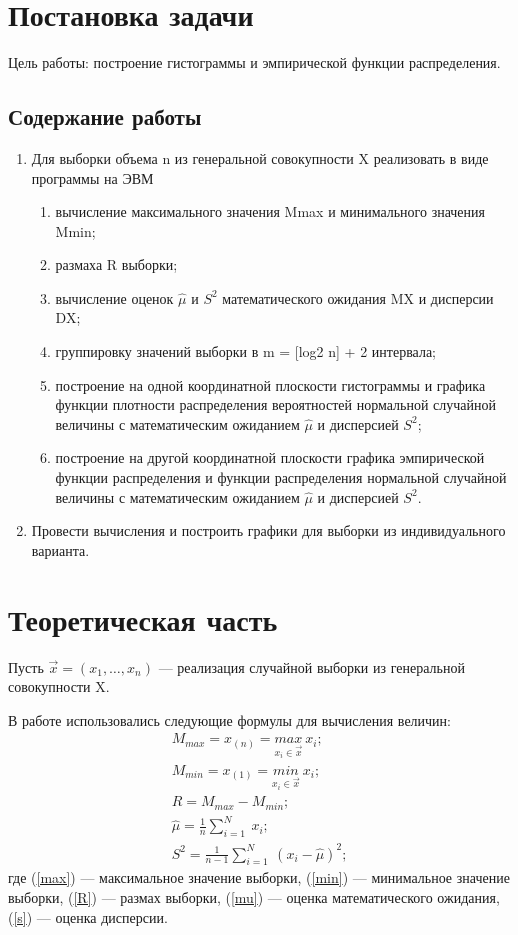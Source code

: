 \documentclass[a4paper, 14pt, unknownkeysallowed]{extreport}
\begin{document}

\setcounter{page}{2}

\chapter{Постановка задачи}
Цель работы: построение гистограммы и эмпирической функции распределения.
\section{Содержание работы}
\begin{enumerate}
	\item Для выборки объема n из генеральной совокупности X реализовать в виде программы на ЭВМ
	\begin{enumerate}
		\item вычисление максимального значения Mmax и минимального значения Mmin;
		\item размаха R выборки;
		\item вычисление оценок $\hat{\mu}$ и $S^2$ математического ожидания MX и дисперсии DX;
		\item группировку значений выборки в m = [log2 n] + 2 интервала;
		\item построение на одной координатной плоскости гистограммы и графика функции плотности распределения вероятностей нормальной случайной величины с математическим
		ожиданием  $\hat{\mu}$ и дисперсией $S^2$;
		\item построение на другой координатной плоскости графика эмпирической функции распределения и функции распределения нормальной случайной величины с математическим
		ожиданием $\hat{\mu}$ и дисперсией $S^2$.
	\end{enumerate}
	\item Провести вычисления и построить графики для выборки из индивидуального варианта.
\end{enumerate}

\chapter{Теоретическая часть}

Пусть $\vec{x} = (x_1, \dots, x_n)$ --- реализация случайной выборки из генеральной совокупности X.

В работе использовались следующие формулы для вычисления величин:
\begin{gather}
	\label{max}
	M_{max} = x_{(n)} = \underset{x_i \in \vec{x}}{max}~x_i;\\
	\label{min}
	M_{min} = x_{(1)} = \underset{x_i \in \vec{x}}{min}~x_i;\\
	\label{R}
	R = M_{max} - M_{min};\\
	\label{mu}
	\hat\mu = \frac{1}{n}\sum_{i = 1}^{N}~x_i;\\
	\label{s}
	S^2 = \frac{1}{n - 1}\sum_{i = 1}^{N}~(x_i - \hat\mu)^2;
\end{gather}
где (\ref{max}) --- максимальное значение выборки, (\ref{min}) --- минимальное значение выборки, (\ref{R}) --- размах выборки, (\ref{mu}) --- оценка математического ожидания, (\ref{s}) --- оценка дисперсии.
\end{document}
